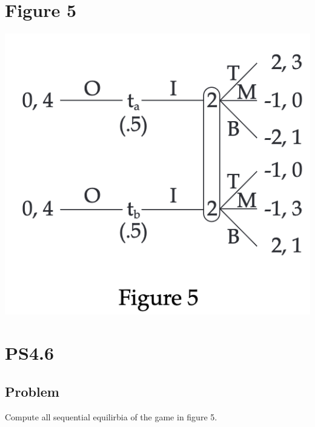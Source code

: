 \documentclass[10pt, a4paper]{article}
\begin{document}
  \section*{Figure 5}
    \begin{center}
      \includegraphics*{fig5.png}
    \end{center}
  \section*{PS4.6}
    \subsection*{Problem}
      Compute all sequential equilirbia of the game in figure 5.
\end{document}
